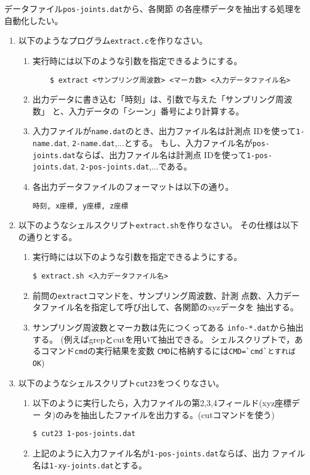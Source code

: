 \documentclass{jarticle}
\begin{document}
データファイル\verb|pos-joints.dat|から、各関節
の各座標データを抽出する処理を自動化したい。
\begin{enumerate}
\item 以下のようなプログラム\verb|extract.c|を作りなさい。
  \begin{enumerate}
  \item 実行時には以下のような引数を指定できるようにする。
\begin{verbatim}
    $ extract <サンプリング周波数> <マーカ数> <入力データファイル名>
\end{verbatim}
  \item 出力データに書き込む「時刻」は、引数で与えた「サンプリング周波数」
    と、入力データの「シーン」番号により計算する。
  \item 入力ファイルが\verb|name.dat|のとき、出力ファイル名は計測点
    IDを使って\verb|1-name.dat|, \verb|2-name.dat|,...とする。
    もし、入力ファイル名が\verb|pos-joints.dat|ならば、出力ファイル名は計測点
    IDを使って\verb|1-pos-joints.dat|,
    \verb|2-pos-joints.dat|,...である。
  \item 各出力データファイルのフォーマットは以下の通り。
\begin{verbatim}
時刻, x座標, y座標, z座標
\end{verbatim}
  \end{enumerate}
\item  以下のようなシェルスクリプト\verb|extract.sh|を作りなさい。
  その仕様は以下の通りとする。
  \begin{enumerate}
  \item 実行時には以下のような引数を指定できるようにする。
\begin{verbatim}
$ extract.sh <入力データファイル名>
\end{verbatim}
  \item 前問の\verb|extract|コマンドを、サンプリング周波数、計測
    点数、入力データファイル名を指定して呼び出して、各関節のxyzデータを
    抽出する。
  \item サンプリング周波数とマーカ数は先につくってある
    \verb|info-*.dat|から抽出する。
    (例えばgrepとcutを用いて抽出できる。
    シェルスクリプトで，あるコマンド\verb|cmd|の実行結果を変数
    \verb|CMD|に格納するには\verb|CMD=`cmd`とすればOK|)

  \end{enumerate}
\item 以下のようなシェルスクリプト\verb|cut23|をつくりなさい。
\begin{enumerate}
\item 以下のように実行したら，入力ファイルの第2,3,4フィールド(xyz座標デー
  タ)のみを抽出したファイルを出力する。(cutコマンドを使う)
\begin{verbatim}
$ cut23 1-pos-joints.dat
\end{verbatim}
\item 上記のように入力ファイル名が\verb|1-pos-joints.dat|ならば、出力
  ファイル名は\verb|1-xy-joints.dat|とする。
\end{enumerate}
\end{enumerate}
\end{document}
